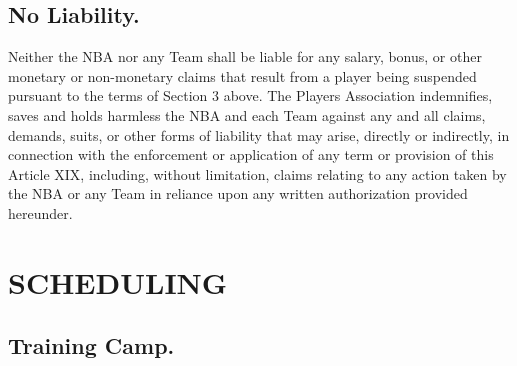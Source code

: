 \documentclass[
]{book}
\begin{document}
\hypertarget{no-liability.}{%
\section{No Liability.}\label{no-liability.}}

Neither the NBA nor any Team shall be liable for any salary, bonus, or other monetary or non-monetary claims that result from a player being suspended pursuant to the terms of Section 3 above. The Players Association indemnifies, saves and holds harmless the NBA and each Team against any and all claims, demands, suits, or other forms of liability that may arise, directly or indirectly, in connection with the enforcement or application of any term or provision of this Article XIX, including, without limitation, claims relating to any action taken by the NBA or any Team in reliance upon any written authorization provided hereunder.

\hypertarget{scheduling}{%
\chapter{SCHEDULING}\label{scheduling}}

\hypertarget{training-camp.}{%
\section{Training Camp.}\label{training-camp.}}
\end{document}
